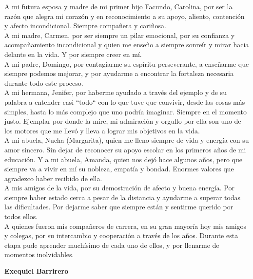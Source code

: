 \documentclass[a4paper,12pt]{report}
\begin{document}
A mi futura esposa y madre de mi primer hijo Facundo, Carolina, por ser la razón 
que alegra mi corazón y en reconocimiento a su apoyo, aliento, contención y afecto
incondicional. Siempre compañera y cariñosa.\\ 

A mi madre, Carmen, por ser siempre un pilar emocional, por su confianza y acompañamiento
incondicional y quien me enseño a siempre sonreír y mirar hacia delante en la vida. Y
por siempre creer en mí.\\

A mi padre, Domingo, por contagiarme su espíritu perseverante, a enseñarme que siempre
podemos mejorar, y por ayudarme a encontrar la fortaleza necesaria durante todo este proceso.\\

A mi hermana, Jenifer, por haberme ayudado a través del ejemplo y de su palabra a entender casi
``todo`` con lo que tuve que convivir, desde las cosas más simples, hasta lo más complejo que uno
podría imaginar. Siempre en el momento justo. Ejemplar por donde la mire, mi admiración y orgullo
por ella son uno de los motores que me llevó y lleva a lograr mis objetivos en la vida.\\  

A mi abuela, Nucha (Margarita), quien me lleno siempre de vida y energía con su amor sincero.
Sin dejar de reconocer su apoyo escolar en los primeros años de mi educación. Y a mi abuela,
Amanda, quien nos dejó hace algunos años, pero que siempre va a vivir en mí su nobleza, empatía y
bondad. Enormes valores que agradezco haber recibido de ella.\\ 

A mis amigos de la vida, por su demostración de afecto y buena energía. Por siempre haber estado
cerca a pesar de la distancia y ayudarme a superar todas las dificultades. Por dejarme saber que
siempre están y sentirme querido por todos ellos.\\

A quienes fueron mis compañeros de carrera, en su gran mayoría hoy mis amigos y colegas, por su
intercambio y cooperación a través de los años. Durante esta etapa pude aprender muchísimo de cada
uno de ellos, y por llenarme de momentos inolvidables.\\

\begin{flushright}
\textbf{Exequiel Barrirero}\\
\end{flushright}
\end{document}
